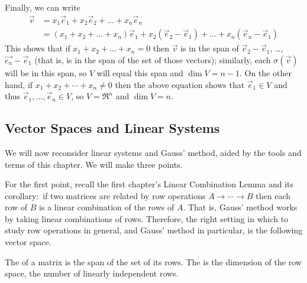 \begin{exercises}
\begin{answer}
      Finally, we can write
      \begin{align*}
        \vec{v} &=x_1\vec{e}_1+x_2\vec{e}_2+\dots+x_n\vec{e}_n  \\
                &=(x_1+x_2+\dots+x_n)\vec{e}_1+x_2(\vec{e}_2-\vec{e}_1)+\dots
                   +x_n(\vec{e}_n-\vec{e}_1)
      \end{align*}
      This shows that if $x_1+x_2+\dots+x_n=0$ then $\vec{v}$ is in the span
      of $\vec{e}_2-\vec{e}_1$, \ldots, $\vec{e_n}-\vec{e}_1$ (that is, is in
      the span of the set of those vectors); similarly, each $\sigma(\vec{v})$
      will be in this span, so $V$ will equal this span and $\dim V=n-1$.
      On the other hand, if $x_1+x_2+\cdots+x_n\neq 0$ then the above equation
      shows that $\vec{e}_1\in V$ and thus $\vec{e}_1,\dots,\vec{e}_n\in V$,
      so $V=\Re^n$ and $\dim V=n$.
    \end{answer}
\end{exercises}



























\subsection{Vector Spaces and Linear Systems}
We will now reconsider linear systems and Gauss' method, 
aided by the tools and terms of this chapter.
We will make three points.

For the first point,
recall the first chapter's
Linear Combination Lemma and its corollary:~if two matrices are
related by row operations $A\longrightarrow\cdots\longrightarrow B$ then
each row of $B$ is a linear combination of the rows of $A$. 
That is, Gauss' method works by taking linear
combinations of rows.
Therefore, the right setting in which to study row operations in general,
and Gauss' method in particular, is the following vector space.

\begin{definition}
The 
of a matrix is the span of the set of its rows.
The 
is the dimension of the row space, the number of linearly independent rows.
\end{definition}

